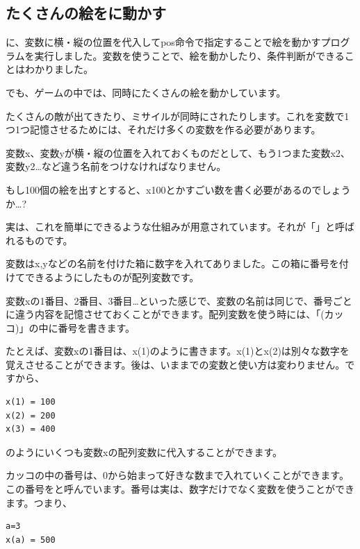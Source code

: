 \newpage
\subsection{たくさんの絵をに動かす}

に、変数に横・縦の位置を代入してpos命令で指定することで絵を動かすプログラムを実行しました。変数を使うことで、絵を動かしたり、条件判断ができることはわかりました。

でも、ゲームの中では、同時にたくさんの絵を動かしています。

たくさんの敵が出てきたり、ミサイルが同時にされたりします。これを変数で1つ1つ記憶させるためには、それだけ多くの変数を作る必要があります。

変数x、変数yが横・縦の位置を入れておくものだとして、もう1つまた変数x2、変数y2…など違う名前をつけなければなりません。

もし100個の絵を出すとすると、x100とかすごい数を書く必要があるのでしょうか…?


実は、これを簡単にできるような仕組みが用意されています。それが「」と呼ばれるものです。

変数はx,yなどの名前を付けた箱に数字を入れてありました。この箱に番号を付けてできるようにしたものが配列変数です。

変数xの1番目、2番目、3番目…といった感じで、変数の名前は同じで、番号ごとに違う内容を記憶させておくことができます。配列変数を使う時には、「(カッコ)」の中に番号を書きます。



たとえば、変数xの1番目は、x(1)のように書きます。x(1)とx(2)は別々な数字を覚えさせることができます。後は、いままでの変数と使い方は変わりません。ですから、



\begin{lstlisting}[numbers=none]
x(1) = 100
x(2) = 200
x(3) = 400
\end{lstlisting}


のようにいくつも変数xの配列変数に代入することができます。

カッコの中の番号は、0から始まって好きな数まで入れていくことができます。この番号をと呼んでいます。番号は実は、数字だけでなく変数を使うことができます。つまり、

\begin{lstlisting}[numbers=none]
a=3
x(a) = 500
\end{lstlisting}

